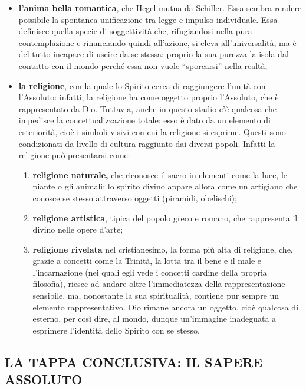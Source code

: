 \documentclass[a4paper,12pt,oneside,openany]{book}%
\begin{document}
\begin{enumerate}
	\begin{itemize}
		\item \textbf{l’anima bella romantica}, che Hegel mutua da Schiller. Essa sembra rendere possibile la spontanea unificazione tra legge e impulso individuale. Essa definisce quella specie di soggettività che, rifugiandosi nella pura contemplazione e rinunciando quindi all’azione, si eleva all’universalità, ma è del tutto incapace di uscire da se stessa: proprio la sua purezza la isola dal contatto con il mondo perché essa non vuole “sporcarsi” nella realtà;
		\item \textbf{la religione}, con la quale lo Spirito cerca di raggiungere l’unità con l’Assoluto: infatti, la religione ha come oggetto proprio l’Assoluto, che è rappresentato da Dio. Tuttavia, anche in questo stadio c’è qualcosa che impedisce la concettualizzazione totale: esso è dato da un elemento di esteriorità, cioè i simboli visivi con cui la religione si esprime. Questi sono condizionati da livello di cultura raggiunto dai diversi popoli. Infatti la religione può presentarsi come:
		
		\begin{enumerate}
			\item \textbf{religione naturale,} che riconosce il sacro in elementi come la luce, le piante o gli animali: lo spirito divino appare allora come un artigiano che conosce se stesso attraverso oggetti (piramidi, obelischi);
			\item \textbf{religione artistica}, tipica del popolo greco e romano, che rappresenta il divino nelle opere d’arte;
			\item \textbf{religione rivelata} nel cristianesimo, la forma più alta di religione, che, grazie a concetti come la Trinità, la lotta tra il bene e il male e l’incarnazione (nei quali egli vede i concetti cardine della propria filosofia), riesce ad andare oltre l’immediatezza della rappresentazione sensibile, ma, nonostante la sua spiritualità, contiene pur sempre un elemento rappresentativo. Dio rimane ancora un oggetto, cioè qualcosa di esterno, per così dire, al mondo, dunque un’immagine inadeguata a esprimere l’identità dello Spirito con se stesso.
		\end{enumerate}
	\end{itemize}
\end{enumerate}

\subsection*{LA TAPPA CONCLUSIVA: IL SAPERE ASSOLUTO}	
\end{document}
